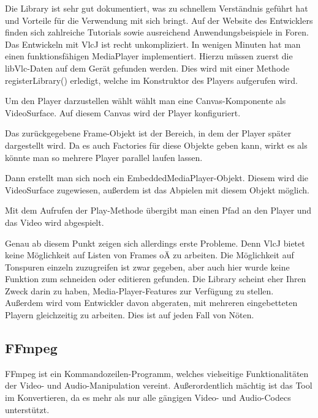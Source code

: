 Die Library ist sehr gut dokumentiert, was zu schnellem Verständnis geführt hat und Vorteile für die Verwendung mit sich bringt. Auf der Website des Entwicklers finden sich zahlreiche Tutorials sowie ausreichend Anwendungsbeispiele in Foren. Das Entwickeln mit VlcJ ist recht unkompliziert. In wenigen Minuten hat man einen funktionsfähigen MediaPlayer implementiert.
Hierzu müssen zuerst die libVlc\cite{vclj_libVlc}-Daten auf dem Gerät gefunden werden. Dies wird mit einer Methode registerLibrary() erledigt, welche im Konstruktor des Players aufgerufen wird.



Um den Player darzustellen wählt wählt man eine Canvas-Komponente als VideoSurface\cite{vlcj_videoSurface}. Auf diesem Canvas wird der Player konfiguriert.



Das zurückgegebene Frame-Objekt ist der Bereich, in dem der Player später dargestellt wird. Da es auch Factories für diese Objekte geben kann, wirkt es als könnte man so mehrere Player parallel laufen lassen.

Dann erstellt man sich noch ein EmbeddedMediaPlayer\cite{vclj_embeddedMediaPlayer}-Objekt. Diesem wird die VideoSurface zugewiesen, außerdem ist das Abpielen mit diesem Objekt möglich.



Mit dem Aufrufen der Play-Methode übergibt man einen Pfad an den Player und das Video wird abgespielt.

Genau ab diesem Punkt zeigen sich allerdings erste Probleme. Denn VlcJ bietet keine Möglichkeit auf Listen von  Frames oÄ zu arbeiten. Die Möglichkeit auf Tonspuren einzeln zuzugreifen ist zwar gegeben, aber auch hier wurde keine Funktion zum schneiden oder editieren gefunden. Die Library scheint eher Ihren Zweck darin zu haben, Media-Player-Features zur Verfügung zu stellen. Außerdem wird vom Entwickler davon abgeraten, mit mehreren eingebetteten Playern gleichzeitig zu arbeiten. Dies ist auf jeden Fall von Nöten.


\subsection{FFmpeg}
FFmpeg ist ein Kommandozeilen-Programm, welches vielseitige Funktionalitäten der Video- und Audio-Manipulation vereint. Außerordentlich mächtig ist das Tool im Konvertieren, da es mehr als nur alle gängigen Video- und Audio-Codecs unterstützt.

